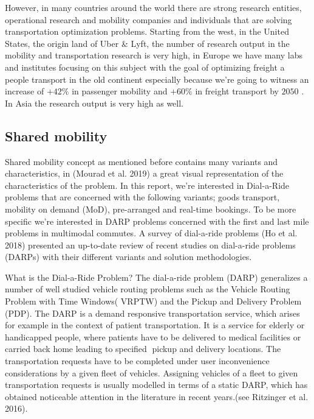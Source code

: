 \documentclass{article}
\begin{document}
However, in many countries around the world there are strong research entities, operational research and mobility companies and individuals that are solving transportation optimization problems. Starting from the west, in the United States, the origin land of Uber \& Lyft, the number of research output in the mobility and transportation research is very high, in Europe we have many labs and institutes focusing on this subject with the goal of optimizing freight a people transport in the old continent especially because we\rq{re} going to witness an increase of $+42\%$ in passenger mobility and $+60\%$ in freight transport by $2050$ \cite{report_EU_2050}. In Asia the research output is very high as well.




\subsection{Shared mobility}
\label{subsec:Shared_Mobility}
Shared mobility concept as mentioned before contains many variants and characteristics, in (Mourad et al. 2019) \cite{MOURAD2019} a great visual representation of the characteristics of the problem. In this report, we\rq{re} interested in Dial-a-Ride problems that are concerned with the following variants; goods transport, mobility on demand (MoD), pre-arranged and real-time bookings. To be more specific we\rq{re} interested in DARP problems concerned with the first and last mile problems in multimodal commutes. A survey of dial-a-ride problems (Ho et al. 2018) \cite{HO_darp2018} presented an up-to-date review of recent studies on dial-a-ride problems (DARPs) with their different variants and solution methodologies. 

What is the Dial-a-Ride Problem? The dial-a-ride problem (DARP) generalizes a number of well studied vehicle routing problems such as the Vehicle Routing Problem with Time Windows(
VRPTW) and the Pickup and Delivery Problem (PDP). The DARP is a demand responsive transportation service, which arises for example in the context of patient transportation.
It is a service for elderly or handicapped people, where patients have to be delivered to medical facilities or carried back home leading to specified pickup and delivery locations. The transportation requests have to be completed under
user inconvenience considerations by a given fleet of vehicles. Assigning vehicles of a fleet to given transportation requests is usually modelled in terms of a static DARP, which has obtained noticeable attention in the literature in
recent years.(see Ritzinger et al. 2016)\cite{Ritzinger_Puchinger2016}.
\end{document}

